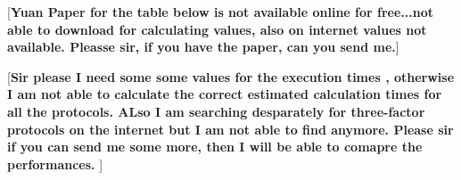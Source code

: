 \documentclass[a4paper,12pt]{report}
\begin{document}
[\textbf{Yuan Paper for the table below is not available online for free...not able to download for calculating values, also on internet values not available. Pleasse sir, if you have the paper, can you send me.}]

\begin{table}[h]
\begin{center}
\caption{A comparison of  execution times of various phases in various three factor Authentication systems}
\end{center}
\label{table:7}
\end{table}

[\textbf{Sir please I need some some values for the execution times , otherwise I am not able to calculate the correct estimated calculation times for all the protocols. ALso I am searching desparately for three-factor protocols on the internet but I am not able to find anymore. Please sir if you can send me some more, then I will be able to comapre the performances. }]
\end{document}
